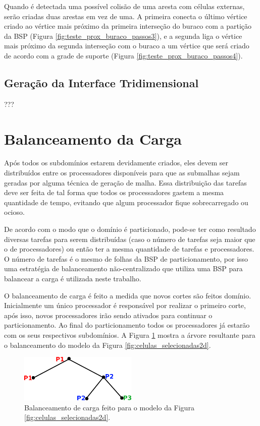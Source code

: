 Quando é detectada uma possível colisão de uma aresta com células externas, serão criadas duas arestas em vez de uma. A primeira conecta o último vértice criado ao vértice mais próximo da primeira interseção do buraco com a partição da BSP (Figura \ref{fig:teste_prox_buraco_passos3}), e a segunda liga o vértice mais próximo da segunda interseção com o buraco a um vértice que será criado de acordo com a grade de suporte (Figura \ref{fig:teste_prox_buraco_passos4}).

\subsection{Geração da Interface Tridimensional}

???

\section{Balanceamento da Carga}


Após todos os subdomínios estarem devidamente criados, eles devem ser distribuídos entre os processadores disponíveis para que as submalhas sejam geradas por alguma técnica de geração de malha. Essa distribuição das tarefas deve ser feita de tal forma que todos os processadores gastem a mesma quantidade de tempo, evitando que algum processador fique sobrecarregado ou ocioso.

De acordo com o modo que o domínio é particionado, pode-se ter como resultado diversas tarefas para serem distribuídas (caso o número de tarefas seja maior que o de processadores) ou então ter a mesma quantidade de tarefas e processadores. O número de tarefas é o mesmo de folhas da BSP de particionamento, por isso uma estratégia de balanceamento não-centralizado que utiliza uma BSP para balancear a carga é utilizada neste trabalho.

O balanceamento de carga é feito a medida que novos cortes são feitos domínio. Inicialmente um único processador é responsável por realizar o primeiro corte, após isso, novos processadores irão sendo ativados para continuar o particionamento. Ao final do particionamento todos os processadores já estarão com os seus respectivos subdomínios. A Figura \ref{fig:arvore_balanceamento} mostra a árvore resultante para o balanceamento do modelo da Figura \ref{fig:celulas_selecionadas2d}.


\begin{figure}[!ht]
	\centering
	\includegraphics[width=0.5\textwidth]{fig/arvore_balanceamento.png}
	\caption{Balanceamento de carga feito para o modelo da Figura \ref{fig:celulas_selecionadas2d}.}
	\label{fig:arvore_balanceamento}
\end{figure}


